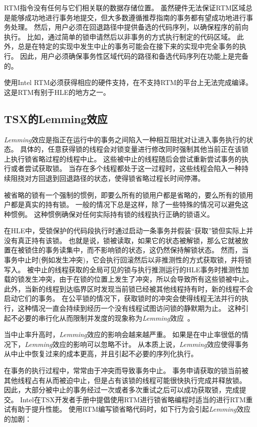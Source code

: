 RTM指令没有任何与它们相关联的数据存储位置。
虽然硬件无法保证RTM区域总是能够成功地进行事务地提交，但大多数遵循推荐指南的事务都有望成功地进行事务处理。
然后，用户必须在回退路径中提供备选的代码序列，以确保程序的前向执行。
比如，通过简单的锁申请然后以非事务的方式执行制定的代码区域。
此外，总是在特定的实现中发生中止的事务可能会在接下来的实现中完全事务的执行。
因此，用户必须确保事务性区域代码的路径和备选代码序列在功能上是完备的。

使用Intel RTM必须获得相应的硬件支持，在不支持RTM的平台上无法完成编译。
这是RTM有别于HLE的地方之一。

\subsection{TSX的Lemming效应}
\textit{Lemming}效应是指正在运行中的事务之间陷入一种相互阻扰对让进入事务执行的状态。
具体的，任意获得锁的线程会对锁变量进行修改同时强制其他当前正在该锁上执行锁省略过程的线程中止。
这些被中止的线程随后会尝试重新尝试事务的执行或者尝试获取锁。
当存在多个线程都处于这一过程时，这些线程会陷入一种持续阻挠对方回退到回退路径的状态，使得锁省略过程长时间停滞。

被省略的锁有一个强制的惯例，即要么所有的锁用户都是省略的，要么所有的锁用户都是真实的持有锁。
一般的情况下总是这样，除了一些特殊的情况可以避免这种惯例。
这种惯例确保对任何实际持有锁的线程执行正确的锁语义。

在HLE中，受锁保护的代码段执行时通过启动一条事务并假装“获取”锁但实际上并没有真正持有该锁。
也就是说，锁被读取，如果它的状态被解锁，那么它就被放置在被锁住的事务读集中，而不影响锁的状态，这仍然保持解锁状态。
然而，当事务中止时(例如发生冲突)，它会执行回滚然后以非推测性的方式获取锁，并将锁写入。
被中止的线程获取的全局可见的锁与执行推测运行的HLE事务时推测性加载的锁发生冲突，由于在锁的位置上发生了冲突，所以会导致所有这些锁被中止。此外，当新的线程到达临界区时发现当前锁已经被其他线程持有时，新的线程不会启动它们的事务。
在公平锁的情况下，获取锁时的冲突会使得线程无法并行的执行，这种情况一直会持续到经历一个没有线程试图访问锁的静默期为止。
这种引起不必要的串行化从而限制并发度的现象称为\textit{Lemming}效应~\cite{Dice2008Applications}。

当中止率升高时，\textit{Lemming}效应的影响会越来越严重。
如果是在中止率很低的情况下，\textit{Lemming}效应的影响可以忽略不计。
从本质上说，\textit{Lemming}效应使得事务从中止中恢复过来的成本更高，并且引起不必要的序列化执行。

在事务的执行过程中，常常由于冲突而导致事务中止。
事务申请获取的锁当前被其他线程占有从而被迫中止，但是占有该锁的线程可能很快执行完成并释放锁。
因此，大部分被中止的事务经过一次或者多次重试之后可以成功获取锁，完成提交。
Intel在TSX开发者手册中提倡使用RTM进行锁省略编程时适当的进行RTM重试有助于提升性能。
使用RTM编写锁省略代码时，如下行为会引起\textit{Lemming}效应的加剧：

